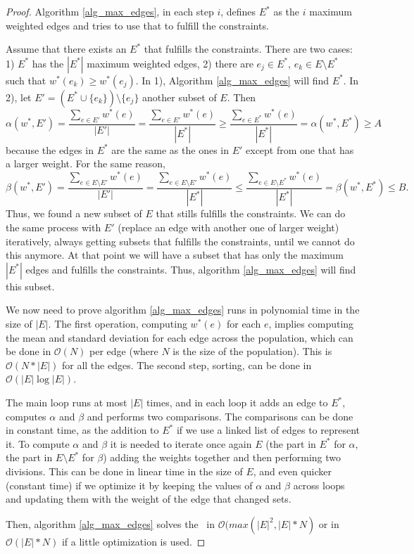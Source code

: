 \begin{proof}
Algorithm \ref{alg_max_edges}, in each step $i$, defines $E^*$ as the $i$ maximum weighted edges and tries to use that to fulfill the constraints.

Assume that there exists an $E^*$ that fulfills the constraints. There are two cases: 1) $E^*$ has the $|E^*|$ maximum weighted edges, 2) there are $e_j \in E^*$, $e_k \in E \setminus E^*$ such that $w^*(e_k) \geq w^*(e_j)$.
In 1), Algorithm \ref{alg_max_edges} will find $E^*$.
In 2), let $E' = (E^* \cup \{e_k\}) \setminus \{e_j\}$ another subset of $E$. Then
$$\alpha(w^*, E') = \frac{\sum_{e \in E'} w^*(e)}{|E'|} = \frac{\sum_{e \in E'} w^*(e)}{|E^*|} \geq \frac{\sum_{e \in E^*} w^*(e)}{|E^*|} = \alpha(w^*, E^*) \geq A$$
because the edges in $E^*$ are the same as the ones in $E'$ except from one that has a larger weight. For the same reason,
$$\beta(w^*, E') = \frac{\sum_{e \in E \setminus E'} w^*(e)}{|E'|} = \frac{\sum_{e \in E \setminus E'} w^*(e)}{|E^*|} \leq \frac{\sum_{e \in E \setminus E^*} w^*(e)}{|E^*|} = \beta(w^*, E^*) \leq B.$$
Thus, we found a new subset of $E$ that stills fulfills the constraints. We can do the same process with $E'$ (replace an edge with another one of larger weight) iteratively, always getting subsets that fulfills the constraints, until we cannot do this anymore. At that point we will have a subset that has only the maximum $|E^*|$ edges and fulfills the constraints. Thus, algorithm \ref{alg_max_edges} will find this subset.

We now need to prove algorithm \ref{alg_max_edges} runs in polynomial time in the size of $|E|$. The first operation, computing $w^*(e)$ for each $e$, implies computing the mean and standard deviation for each edge across the population, which can be done in $\mathcal{O}(N)$ per edge (where $N$ is the size of the population). This is $\mathcal{O}(N*|E|)$ for all the edges. The second step, sorting, can be done in $\mathcal{O}(|E|\log{|E|})$.

The main loop runs at most $|E|$ times, and in each loop it adds an edge to $E^*$, computes $\alpha$ and $\beta$ and performs two comparisons. The comparisons can be done in constant time, as the addition to $E^*$ if we use a linked list of edges to represent it. To compute $\alpha$ and $\beta$ it is needed to iterate once again $E$ (the part in $E^*$ for $\alpha$, the part in $E \setminus E^*$ for $\beta$) adding the weights together and then performing two divisions. This can be done in linear time in the size of $E$, and even quicker (constant time) if we optimize it by keeping the values of $\alpha$ and $\beta$ across loops and updating them with the weight of the edge that changed sets. 

Then, algorithm \ref{alg_max_edges} solves the \PROBLEM~in $\mathcal{O}(max(|E|^2, |E|*N)$ or in $\mathcal{O}(|E|*N)$ if a little optimization is used.

\end{proof}

